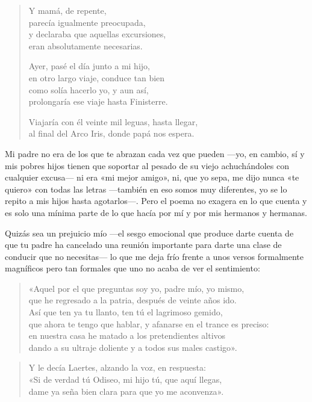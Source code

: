\begin{verse}
Y mamá, de repente,\\
parecía igualmente preocupada,\\
y declaraba que aquellas excursiones,\\
eran absolutamente necesarias.

Ayer, pasé el día junto a mi hijo,\\
en otro largo viaje, conduce tan bien\\
como solía hacerlo yo, y aun así,\\
prolongaría ese viaje hasta Finisterre.

Viajaría con él veinte mil leguas, hasta llegar,\\
al final del Arco Iris, donde papá nos espera.
\end{verse}

Mi padre no era de los que te abrazan cada vez que pueden ---yo, en cambio, sí y mis pobres hijos tienen que soportar al pesado de su viejo achuchándoles con cualquier excusa--- ni era «mi mejor amigo», ni, que yo sepa, me dijo nunca «te quiero» con todas las letras ---también en eso somos muy diferentes, yo se lo repito a mis hijos hasta agotarlos---. Pero el poema no exagera en lo que cuenta y es solo una mínima parte de lo que hacía por mí y por mis hermanos y hermanas.

Quizás sea un prejuicio mío ---el sesgo emocional que produce darte cuenta de que tu padre ha cancelado una reunión importante para darte una clase de conducir que no necesitas--- lo que me deja frío frente a unos versos formalmente magníficos pero tan formales que uno no acaba de ver el sentimiento:

\begin{verse}
«Aquel por el que preguntas soy yo, padre mío, yo mismo,\\
que he regresado a la patria, después de veinte años ido.\\
Así que ten ya tu llanto, ten tú el lagrimoso gemido,\\
que ahora te tengo que hablar, y afanarse en el trance es preciso:\\
en nuestra casa he matado a los pretendientes altivos\\
dando a su ultraje doliente y a todos sus males castigo».
\end{verse}

\begin{verse}
Y le decía Laertes, alzando la voz, en respuesta:\\
«Si de verdad tú Odiseo, mi hijo tú, que aquí llegas,\\
dame ya seña bien clara para que yo me aconvenza».
\end{verse}

